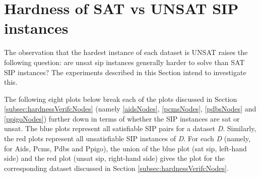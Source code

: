 \documentclass{l4proj}
\begin{document}
\section{Hardness of SAT vs UNSAT SIP instances}
The observation that the hardest instance of each dataset is UNSAT raises the following question: are \gls{unsat} \gls{sip} instances generally harder to solve than SAT SIP instances? The experiments described in this Section intend to investigate this.

The following eight plots below break each of the plots discussed in Section \ref{subsec:hardnessVerifcNodes} (namely \ref{aidsNodes}, \ref{pcmsNodes}, \ref{pdbsNodes} and \ref{ppigoNodes}) further down in terms of whether the SIP instances are \gls{sat} or \gls{unsat}. The blue plots represent all satisfiable SIP pairs for a dataset \emph{D}. Similarly, the red plots represent all unsatisfiable SIP instances of \emph{D}. For each \emph{D} (namely, for Aids, Pcms, Pdbs and Ppigo), the union of the blue plot (\gls{sat} \gls{sip}, left-hand side) and the red plot (\gls{unsat} \gls{sip}, right-hand side) gives the plot for the corresponding dataset discussed in Section \ref{subsec:hardnessVerifcNodes}.
\end{document}
